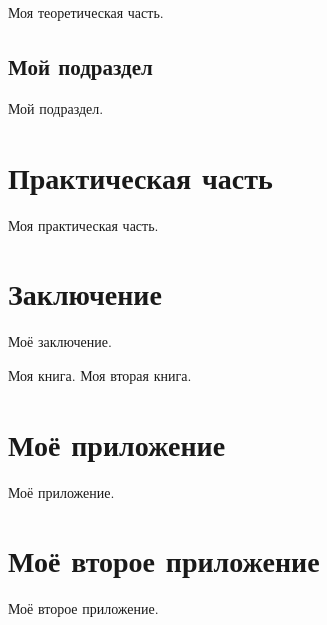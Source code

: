 \documentclass{mirea}
\begin{document}
	Моя теоретическая часть.
	
	\subsection{Мой подраздел}
	
	Мой подраздел.
	
	
	
	\section{Практическая часть}
	
	Моя практическая часть.
	
	
	
	\section*{Заключение}
	
	Моё заключение.
	
	
	
	\begin{thebibliography}{99\kern\bibindent}
		 Моя книга.
		 Моя вторая книга. 
	\end{thebibliography}
	
	
	
	\appendix
	
	\section{Моё приложение}
	
	Моё приложение.
	
	\section{Моё второе приложение}
	
	Моё второе приложение.
	
	
	
\end{document}
